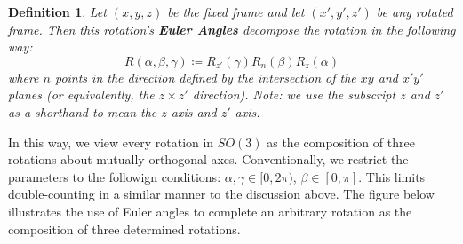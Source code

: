 \documentclass[10pt]{ucthesis}
\newtheorem{definition}{Definition}[chapter]
\begin{document}
\begin{definition}
	Let $(x,y,z)$ be the fixed frame and let $(x',y',z')$ be any rotated frame. Then this rotation's \textbf{Euler Angles} decompose the rotation in the following way:
$$R(\alpha,\beta,\gamma) \coloneq R_{z'}(\gamma)R_n(\beta)R_z(\alpha)$$
where $n$ points in the direction defined by the intersection of the $xy$ and $x'y'$ planes (or equivalently, the $z\times z'$ direction). Note: we use the subscript $z$ and $z'$ as a shorthand to mean the $z$-axis and $z'$-axis.
\end{definition}

In this way, we view every rotation in $SO(3)$ as the composition of three rotations about mutually orthogonal axes. Conventionally, we restrict the parameters to the followign conditions: $\alpha,\gamma\in[0,2\pi)$, $\beta\in[0,\pi]$. This limits double-counting in a similar manner to the discussion above. The figure below illustrates the use of Euler angles to complete an arbitrary rotation as the composition of three determined rotations.\\
\end{document}
